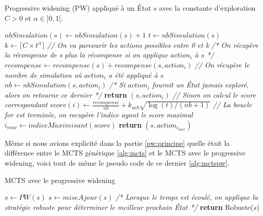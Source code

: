 \documentclass[pdftex,french, english]{article}	%
\begin{document}
		\begin{algorithm}[H]
			\caption{Progressive widening (PW) appliqué à un État $s$ avec la constante d'exploration $C > 0$ et $\alpha \in ]0, 1[$.}
			\label{alg:spw}
				\begin{algorithmic}[1]
						\State $nbSimulation(s) \gets nbSimulation(s) + 1$ 
						\State $t \gets nbSimulation(s)$
						\State $k \gets \lceil{C \times t^{\alpha}}\rceil$
						\State \textit{// On va parcourir les actions possibles entre 0 et k}
							\State \textit{/* On récupère la récompense de s plus la récompense si on applique $action_{i}$ à $s$ */}
							\State $recompense \gets recompense(s) + recompense(s, action_{i})$
							\State \textit{// On récupère le nombre de simulation où $action_{i}$ a été appliqué à $s$}
							\State $nb \gets nbSimulation(s, action_{i})$
								\State \textit{/* Si $action_{i}$ fournit un État jamais exploré, alors on retourne ce dernier */}
								\State \textbf{return} $(s, action_{i})$
							\Else
								\State \textit{// Sinon on calcul le score correspondant}
								\State $score(i) \gets \frac{recompense}{nb} + \textbf{$k_{ucb}$}\sqrt{\log(t)/(nb + 1)}$							
							\EndIf
						\EndFor
						\State \textit{// La boucle for est terminée, on recupère l'indice ayant le score maximal}
						\State $i_{max} \gets indiceMaximisant(score)$
						\State \textbf{return} $(s, action_{i_{max}})$
					\EndFunction
				\end{algorithmic}
		\end{algorithm}

		Même si nous avions explicité dans la partie \ref{pw:principe} quelle était la différence entre le MCTS générique \ref{alg:mcts} et le MCTS avec le progressive widening, voici tout de même le pseudo code de ce dernier \ref{alg:mctspw}.

		\begin{algorithm}[H]
			\caption{MCTS avec le progressive widening}
			\label{alg:mctspw}
				\begin{algorithmic}[1]
								\State $s \gets PW(s)$ 
							\EndWhile
						\State $s \gets miseAjour(s)$
						\EndWhile
						\State \textit{/* Lorsque le temps est écoulé, on applique la stratégie robuste pour déterminer le meilleur prochain État */}
					\State \textbf{return} Robuste($s$)
					\EndFunction
				\end{algorithmic}
		\end{algorithm}
\end{document}
